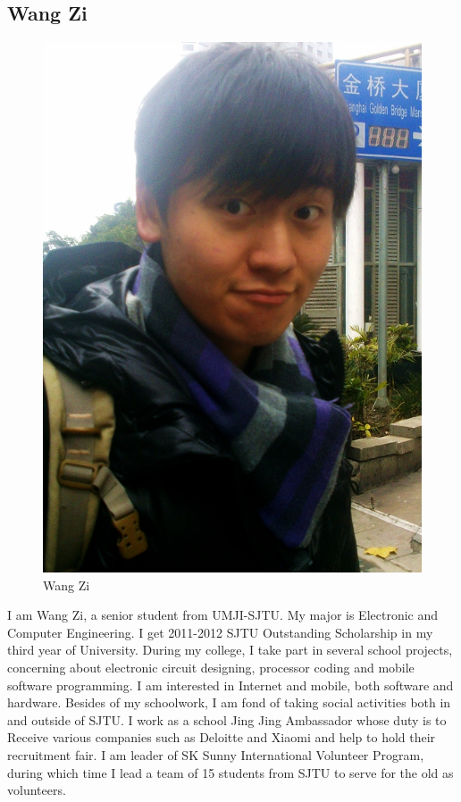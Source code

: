 \documentclass[paper=letter, fontsize=11pt]{scrartcl}
\numberwithin{equation}{section}		%
\numberwithin{figure}{section}			%
\numberwithin{table}{section}			%
\begin{document}
\subsection{Wang Zi}
\begin{figure}[H]
	\centering
	\includegraphics[scale=0.5]{W.jpg}
	\caption{Wang Zi}
\end{figure}
I am Wang Zi, a senior student from UMJI-SJTU. My major is Electronic and Computer Engineering. I get 2011-2012 SJTU Outstanding Scholarship in my third year of University. During my college, I take part in several school projects, concerning about electronic circuit designing, processor coding and mobile software programming. I am interested in Internet and mobile, both software and hardware. Besides of my schoolwork, I am fond of taking social activities both in and outside of SJTU. I work as a school Jing Jing Ambassador whose duty is to Receive various companies such as Deloitte and Xiaomi and help to hold their recruitment fair. I am leader of SK Sunny International Volunteer Program, during which time I lead a team of 15 students from SJTU to serve for the old as volunteers. 
\end{document}
